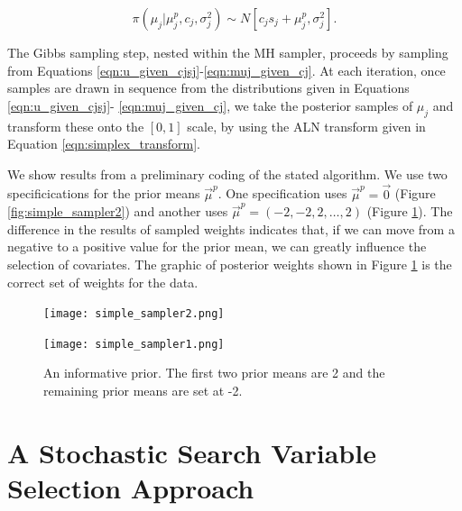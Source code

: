 \begin{equation}\label{eqn:muj_given_cj}
\pi(\mu_j\vert \mu_j^p, c_j, \sigma^2_j)\sim N[c_js_j+\mu_j^p, \sigma_j^2].
\end{equation}

 The Gibbs sampling step, nested within the MH sampler, proceeds by sampling from Equations \ref{eqn:u_given_cjsj}-\ref{eqn:muj_given_cj}.
At each iteration, once samples are drawn in sequence from the distributions given in Equations \ref{eqn:u_given_cjsj}- \ref{eqn:muj_given_cj}, we take the posterior samples of $\mu_j$ and transform these onto the $[0,1]$ scale, by using the ALN transform given in Equation \ref{eqn:simplex_transform}. 

We show results from a preliminary coding of the stated algorithm. We use two specificications for the prior means $\vec{\mu}^p$. One specification uses  $\vec{\mu}^p = \vec{0}$ (Figure \ref{fig:simple_sampler2}) and another uses $\vec{\mu}^p=(-2,-2,2,\dots,2)$ (Figure \ref{fig:simple_sampler1}). The difference in the results of sampled weights indicates that, if we can move from a negative to a positive value for the prior mean, we can greatly influence the selection of covariates. The graphic of posterior weights shown in Figure \ref{fig:simple_sampler1} is the correct set of weights for the data. 



 \begin{figure}[ht]
\begin{minipage}[b]{0.45\linewidth}
\centering
\texttt{[image: simple\_sampler2.png]}
\caption[Results for the zero mean prior]{A zero mean prior. Note that the two covariates that should have large probabilities are covariates 1 and 2.}
\label{fig:simple_sampler2}
\end{minipage}
\hspace{0.5cm}
\begin{minipage}[b]{0.45\linewidth}
\centering
\texttt{[image: simple\_sampler1.png]}
\caption[Results for the informative prior]{An informative prior. The first two prior means are 2 and the remaining prior means are set at -2.}
\label{fig:simple_sampler1}
\end{minipage}
\end{figure}



\section{A Stochastic Search Variable Selection Approach}\label{sec:PX_1}

